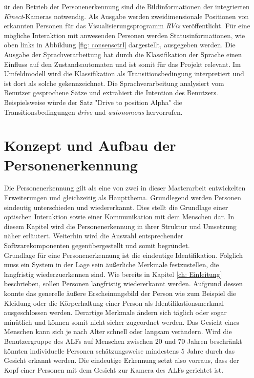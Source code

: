 	ür den Betrieb der Personenerkennung sind die Bildinformationen der integrierten \textit{Kinect}-Kameras notwendig. Als Ausgabe werden zweidimensionale Positionen von erkannten Personen für das Visualisierungsprogramm \textit{RViz} veröffentlicht. Für eine mögliche Interaktion mit anwesenden Personen werden Statusinformationen, wie oben links in Abbildung \ref{fig: consensctrl} dargestellt, ausgegeben werden. Die Ausgabe der Sprachverarbeitung hat durch die Klassifikation der Sprache einen Einfluss auf den Zustandsautomaten und ist somit für das Projekt relevant. Im Umfeldmodell wird die Klassifikation als Transitionsbedingung interpretiert und ist dort als solche gekennzeichnet. Die Sprachverarbeitung analysiert vom Benutzer gesprochene Sätze und extrahiert die Intention des Benutzers. Beispielsweise würde der Satz "Drive to position Alpha" die Transitionsbedingungen \textit{drive} und \textit{autonomous} hervorrufen. \\
		
	
	
	
	
	\section{Konzept und Aufbau der Personenerkennung}
	\label{sec: Konzept Personenerkennung}
	
	Die Personenerkennung gilt als eine von zwei in dieser Masterarbeit entwickelten Erweiterungen und gleichzeitig als Hauptthema. Grundlegend werden Personen eindeutig unterschieden und wiedererkannt. Dies stellt die Grundlage einer optischen Interaktion sowie einer Kommunikation mit dem Menschen dar. In diesem Kapitel wird die Personenerkennung in ihrer Struktur und Umsetzung näher erläutert. Weiterhin wird die Auswahl entsprechender Softwarekomponenten gegenübergestellt und somit begründet.\\
	
	Grundlage für eine Personenerkennung ist die eindeutige Identifikation. Folglich muss ein System in der Lage sein äußerliche Merkmale festzustellen, die langfristig wiederzuerkennen sind. Wie bereits in Kapitel \ref{ch: Einleitung} beschrieben, sollen Personen langfristig wiedererkannt werden. Aufgrund dessen konnte das generelle äußere Erscheinungsbild der Person wie zum Beispiel die Kleidung oder die Körperhaltung einer Person als Identifikationsmerkmal ausgeschlossen werden. Derartige Merkmale ändern sich täglich oder sogar minütlich und können somit nicht sicher zugeordnet werden. Das Gesicht eines Menschen kann sich je nach Alter schnell oder langsam verändern. Wird die Benutzergruppe des ALFs auf Menschen zwischen 20 und 70 Jahren beschränkt könnten individuelle Personen schätzungsweise mindestens 5 Jahre durch das Gesicht erkannt werden. Die eindeutige Erkennung setzt also vorraus, dass der Kopf einer Personen mit dem Gesicht zur Kamera des ALFs gerichtet ist. \\ 
	
